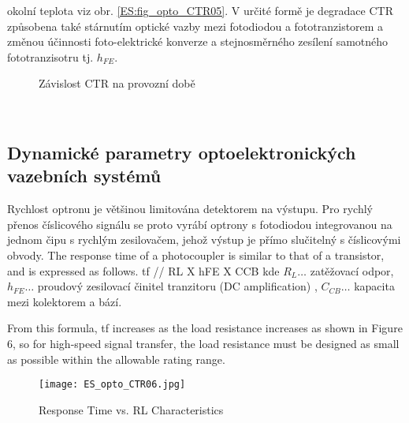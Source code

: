 \begin{itemize}
                okolní teplota viz obr. \ref{ES:fig_opto_CTR05}. V určité formě je degradace CTR
                způsobena také stárnutím optické vazby mezi fotodiodou a fototranzistorem a změnou
                účinnosti foto-elektrické konverze a stejnosměrného zesílení
                samotného fototranzisotru tj. \(h_{FE}\).              
                \begin{figure}[ht!]
                  \centering
                    {}   \newline
                    {}   
                  \caption{Závislost CTR na provozní době}
                  \label{ES:fig_opto_CTRtime}
                \end{figure}
        \end{itemize}      
      \       
      \subsection{Dynamické parametry optoelektronických vazebních systémů}
        Rychlost optronu je většinou limitována detektorem na výstupu. Pro rychlý přenos číslicového
        signálu se proto vyrábí optrony s fotodiodou integrovanou na jednom čipu s rychlým
        zesilovačem, jehož výstup je přímo slučitelný s číslicovými obvody. 
        The response time of a photocoupler is similar to that of a transistor, and is expressed as
        follows. tf // RL X hFE X CCB kde \(R_L\ldots\) zatěžovací odpor, \(h_{FE}\ldots\) proudový
        zesilovací činitel tranzitoru (DC amplification) , \(C_{CB}\ldots\) kapacita mezi kolektorem
        a bází.
                      
        From this formula, tf increases as the load resistance increases as shown in Figure 6, so
        for high-speed signal transfer, the load resistance must be designed as small as possible
        within the allowable rating range.      
         \begin{figure}[ht!]
           \centering
           \texttt{[image: ES\_opto\_CTR06.jpg]}
           \caption{Response Time vs. RL Characteristics }
           \label{es:fig_opto_CTR06}
         \end{figure}      
      
